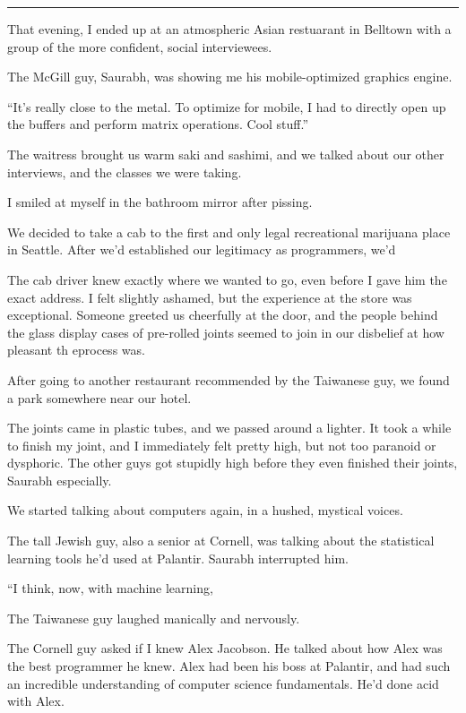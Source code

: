 \plainfancybreak{12pt}{2}{* * *}

That evening, I ended up at an atmospheric Asian restuarant in Belltown with a
group of the more confident, social interviewees.  

The McGill guy, Saurabh, was showing me his mobile-optimized graphics engine.

``It's really close to the metal.  To optimize for mobile, I had to directly
open up the buffers and perform matrix operations.  Cool stuff.''

The waitress brought us warm saki and sashimi, and we talked about our other
interviews, and the classes we were taking.  

I smiled at myself in the bathroom mirror after pissing.

We decided to take a cab to the first and only legal recreational marijuana
place in Seattle.  After we'd established our legitimacy as programmers, we'd 

The cab driver knew exactly where we wanted to go, even before I gave him the
exact address.  I felt slightly ashamed, but the experience at the store was
exceptional.  Someone greeted us cheerfully at the door, and the people behind
the glass display cases of pre-rolled joints seemed to join in our disbelief at
how pleasant th eprocess was.

After going to another restaurant recommended by the Taiwanese guy, we found a
park somewhere near our hotel.

The joints came in plastic tubes, and we passed around a lighter.  It took a
while to finish my joint, and I immediately felt pretty high, but not too
paranoid or dysphoric.  The other guys got stupidly high before they even
finished their joints, Saurabh especially.

We started talking about computers again, in a hushed, mystical voices.

The tall Jewish guy, also a senior at Cornell, was talking about the statistical
learning tools he'd used at Palantir.   Saurabh interrupted him.

``I think, now, with machine learning, 

The Taiwanese guy laughed manically and nervously.

The Cornell guy asked if I knew Alex Jacobson.  He talked about how Alex was the
best programmer he knew. Alex had been his boss at Palantir, and had such an
incredible understanding of computer science fundamentals.  He'd done acid with
Alex. 

